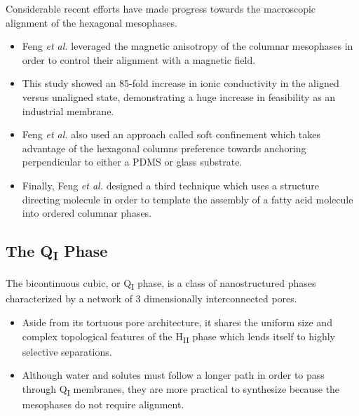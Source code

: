   Considerable recent efforts have made progress towards the macroscopic
  alignment of the hexagonal mesophases.
  \begin{itemize}
    \item Feng \textit{et al.} leveraged the magnetic anisotropy of the columnar
    mesophases in order to control their alignment with a magnetic field.~\cite{feng_scalable_2014}
    \item This study showed an 85-fold increase in ionic conductivity in the aligned
    versus unaligned state, demonstrating a huge increase in feasibility as an industrial membrane.
    \item Feng \textit{et al.} also used an approach called soft confinement which
    takes advantage of the hexagonal columns preference towards anchoring
    perpendicular to either a PDMS or glass substrate.~\cite{feng_thin_2016}
    \item Finally, Feng \textit{et al.} designed a third technique which uses a structure
    directing molecule in order to template the assembly of a fatty acid 
    molecule into ordered columnar phases.~\cite{feng_highly_2017}
  \end{itemize}
  
  \subsection{The Q\textsubscript{I} Phase}
  
  The bicontinuous cubic, or Q\textsubscript{I} phase, is a class 
  of nanostructured phases characterized by a network of 3 dimensionally
  interconnected pores.~\cite{hyde_bicontinuous_1996}
  \begin{itemize}
    \item Aside from its tortuous pore architecture, it shares the 
    uniform size and complex topological features of the H\textsubscript{II} phase
    which lends itself to highly selective separations.
    \item Although water and solutes must follow a longer path in order to pass
    through Q\textsubscript{I} membranes, they are more practical to synthesize
    because the mesophases do not require alignment.~\cite{zhou_new_2007}
  \end{itemize}
  
